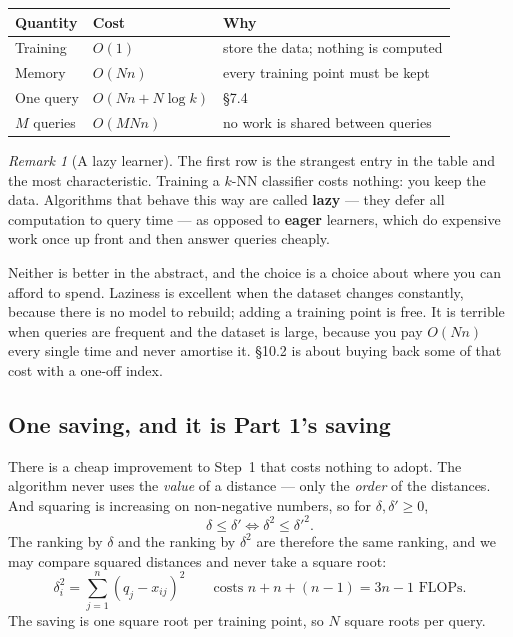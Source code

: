 \documentclass[11pt]{article}
\theoremstyle{plain}
\theoremstyle{definition}
\theoremstyle{remark}
\newtheorem*{rmk}{Remark}
\begin{document}
\begin{center}
\renewcommand{\arraystretch}{1.35}
\begin{tabular}{@{}l l l@{}}
\toprule
\textbf{Quantity} & \textbf{Cost} & \textbf{Why} \\
\midrule
Training                  & $O(1)$      & store the data; nothing is computed \\
Memory                    & $O(Nn)$     & every training point must be kept \\
One query                 & $O(Nn + N\log k)$ & \S7.4 \\
$M$ queries               & $O(MNn)$    & no work is shared between queries \\
\bottomrule
\end{tabular}
\end{center}

\begin{rmk}[A lazy learner]
The first row is the strangest entry in the table and the most characteristic.
Training a $k$-NN classifier costs nothing: you keep the data. Algorithms that
behave this way are called \textbf{lazy} --- they defer all computation to query
time --- as opposed to \textbf{eager} learners, which do expensive work once up
front and then answer queries cheaply.

Neither is better in the abstract, and the choice is a choice about where you
can afford to spend. Laziness is excellent when the dataset changes constantly,
because there is no model to rebuild; adding a training point is free. It is
terrible when queries are frequent and the dataset is large, because you pay
$O(Nn)$ every single time and never amortise it. \S10.2 is about buying back
some of that cost with a one-off index.
\end{rmk}

\subsection{One saving, and it is Part 1's saving}
There is a cheap improvement to Step~1 that costs nothing to adopt. The
algorithm never uses the \emph{value} of a distance --- only the \emph{order} of
the distances. And squaring is increasing on non-negative numbers, so for
$\delta,\delta'\ge0$,
\[
  \delta \le \delta' \iff \delta^{2} \le \delta'^{2} .
\]
The ranking by $\delta$ and the ranking by $\delta^{2}$ are therefore the same
ranking, and we may compare squared distances and never take a square root:
\[
  \delta_i^{2} = \sum_{j=1}^{n}(q_j - x_{ij})^{2}
  \qquad\text{costs } n + n + (n-1) = 3n-1 \text{ FLOPs} .
\]
The saving is one square root per training point, so $N$ square roots per query.
\end{document}
